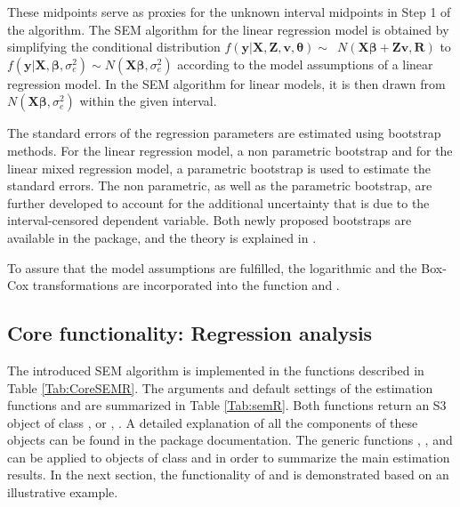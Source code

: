 These midpoints serve as proxies for the unknown interval midpoints in Step 1 of the algorithm.  The SEM algorithm for the linear regression model is obtained by simplifying the conditional distribution \(f\left(\mathbf{y}|\mathbf{X}, \mathbf{Z}, \mathbf{v}, \boldsymbol{\theta}\right)  \sim \enspace N\left(\mathbf{X}\boldsymbol{\beta}+\mathbf{Z}\mathbf{v}, \mathbf{R}\right)\) to \(f\left(\mathbf{y}|\mathbf{X},\boldsymbol{\beta}, \sigma_{e}^{2}\right) \sim N\left(\mathbf{X}\boldsymbol{\beta}, \sigma_{e}^{2}\right)\) according to the model assumptions of a linear regression model. In the  SEM algorithm for linear models, it is then drawn from \(N\left(\mathbf{X}\boldsymbol{\beta}, \sigma_{e}^{2}\right)\) within the given interval. 

The standard errors of the regression parameters are estimated using bootstrap methods. For the linear regression model, a non parametric bootstrap \citep{Efr81, Efr82, Efr86, Efr93} and for the linear mixed regression model, a parametric bootstrap \citep{Wan06, Tha13} is used to estimate the standard errors. The non parametric, as well as the parametric bootstrap, are further developed to account for the additional uncertainty that is due to the interval-censored dependent variable.  Both newly proposed bootstraps are available in the  package, and the theory is explained in \citep{Wal19}.

To assure that the model assumptions are fulfilled, the logarithmic and the Box-Cox transformations are incorporated into the function  and . 



\subsection{Core functionality: Regression analysis}\label{Sec:RegressionCoreR}

The introduced SEM algorithm is implemented in the functions described in Table \ref{Tab:CoreSEMR}. The arguments and default settings of the estimation functions  and  are summarized in Table \ref{Tab:semR}. Both functions return an S3 object of class ,  or , . A detailed explanation of all the components of these objects can be found in the  package documentation. The generic functions , , and  can be applied  to objects of class  and  in order to summarize the main estimation results. In the next section, the functionality of  and  is demonstrated based on an illustrative example.

